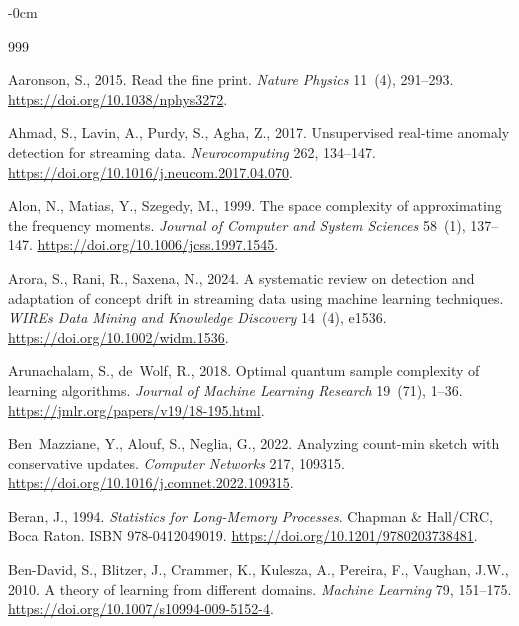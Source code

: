 \documentclass[sensors,article,submit,pdftex,moreauthors]{Definitions/mdpi}
\begin{document}

\begin{adjustwidth}{-\extralength}{0cm}
\begin{thebibliography}{999}

Aaronson, S., 2015.
\newblock Read the fine print.
\newblock \emph{Nature Physics} 11~(4), 291--293.
\newblock \url{https://doi.org/10.1038/nphys3272}.

Ahmad, S., Lavin, A., Purdy, S., Agha, Z., 2017.
\newblock Unsupervised real-time anomaly detection for streaming data.
\newblock \emph{Neurocomputing} 262, 134--147.
\newblock \url{https://doi.org/10.1016/j.neucom.2017.04.070}.

Alon, N., Matias, Y., Szegedy, M., 1999.
\newblock The space complexity of approximating the frequency moments.
\newblock \emph{Journal of Computer and System Sciences} 58~(1), 137--147.
\newblock \url{https://doi.org/10.1006/jcss.1997.1545}.

Arora, S., Rani, R., Saxena, N., 2024.
\newblock A systematic review on detection and adaptation of concept drift in streaming data using machine learning techniques.
\newblock \emph{WIREs Data Mining and Knowledge Discovery} 14~(4), e1536.
\newblock \url{https://doi.org/10.1002/widm.1536}.

Arunachalam, S., de~Wolf, R., 2018.
\newblock Optimal quantum sample complexity of learning algorithms.
\newblock \emph{Journal of Machine Learning Research} 19~(71), 1--36.
\newblock \url{https://jmlr.org/papers/v19/18-195.html}.

Ben~Mazziane, Y., Alouf, S., Neglia, G., 2022.
\newblock Analyzing count-min sketch with conservative updates.
\newblock \emph{Computer Networks} 217, 109315.
\newblock \url{https://doi.org/10.1016/j.comnet.2022.109315}.

Beran, J., 1994.
\newblock \emph{Statistics for Long-Memory Processes}.
\newblock Chapman \& Hall/CRC, Boca Raton. ISBN 978-0412049019.
\newblock \url{https://doi.org/10.1201/9780203738481}.

Ben-David, S., Blitzer, J., Crammer, K., Kulesza, A., Pereira, F., Vaughan, J.W., 2010.
\newblock A theory of learning from different domains.
\newblock \emph{Machine Learning} 79, 151--175.
\newblock \url{https://doi.org/10.1007/s10994-009-5152-4}.


\end{thebibliography}
\end{adjustwidth}
\end{document}
